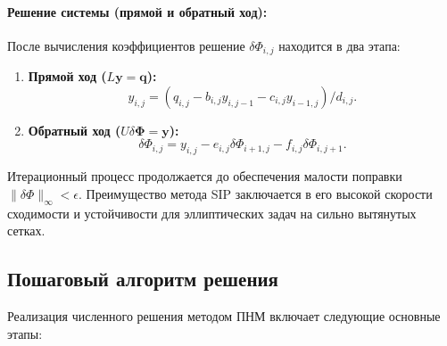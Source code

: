 \documentclass[a4paper,12pt]{article}
\begin{document}
	\paragraph{Решение системы (прямой и обратный ход):}
	После вычисления коэффициентов решение $\delta \Phi_{i,j}$ находится в два этапа:
	\begin{enumerate}
		\item \textbf{Прямой ход ($L\mathbf{y} = \mathbf{q}$):}
		\[ y_{i,j} = (q_{i,j} - b_{i,j} y_{i,j-1} - c_{i,j} y_{i-1,j}) / d_{i,j}. \]
		\item \textbf{Обратный ход ($U \delta \boldsymbol{\Phi} = \mathbf{y}$):}
		\[ \delta \Phi_{i,j} = y_{i,j} - e_{i,j} \delta \Phi_{i+1,j} - f_{i,j} \delta \Phi_{i,j+1}. \]
	\end{enumerate}
	
	Итерационный процесс продолжается до обеспечения малости поправки $\|\delta \Phi\|_\infty < \epsilon$. Преимущество метода SIP заключается в его высокой скорости сходимости и устойчивости для эллиптических задач на сильно вытянутых сетках.
	
	\subsection{Пошаговый алгоритм решения}
	
	Реализация численного решения методом ПНМ включает следующие основные этапы:
	
\end{document}
